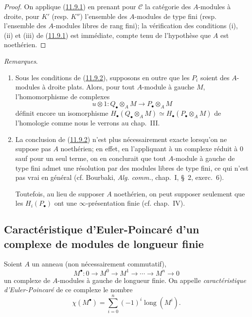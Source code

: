 \begin{proof}
On applique (\hyperref[0.11.9.1-fr]{11.9.1}) en prenant pour $\mathcal C$ la
catégorie des $A$-modules à droite, pour $K'$ (resp. $K''$) l'ensemble des
$A$-modules de type fini (resp. l'ensemble des $A$-modules libres de rang
fini); la vérification des conditions (i), (ii) et (iii) de
(\hyperref[0.11.9.1-fr]{11.9.1}) est immédiate, compte tenu de l'hypothèse
que $A$ est noethérien.
\end{proof}

\begin{env}[11.9.3]
\label{0.11.9.3-fr}
\emph{Remarques}.
\begin{enumerate}
\item[{\rm(i)}] Sous les conditions de
(\hyperref[0.11.9.2-fr]{11.9.2}), supposons en outre que les $P_i$ soient des
$A$-modules à droite plats. Alors, pour tout $A$-module à gauche $M$,
l'homomorphisme de complexes
\[
u\otimes 1:Q_\bullet\otimes_A M\longrightarrow P_\bullet\otimes_A M
\]
définit encore un isomorphisme
$H_\bullet(Q_\bullet\otimes_A M)\simeq
H_\bullet(P_\bullet\otimes_A M)$ de l'homologie comme nous le verrons au
chap.~III.
\item[{\rm(ii)}] La conclusion de (\hyperref[0.11.9.2-fr]{11.9.2}) n'est
plus nécessairement exacte lorsqu'on ne suppose pas $A$ noethérien; en
effet, en l'appliquant à un complexe réduit à $0$ sauf pour un seul terme, on
en conclurait que tout $A$-module à gauche de type fini admet une résolution
par des modules libres de type fini, ce qui n'est pas vrai en général
(cf. Bourbaki, \emph{Alg. comm.}, chap.~I, \S~2, exerc.~6).

Toutefois, au lieu de supposer $A$ noethérien, on peut supposer seulement que
les $H_i(P_\bullet)$ ont une $\infty$-présentation finie (cf. chap.~IV).
\end{enumerate}
\end{env}

\subsection{Caractéristique d'Euler-Poincaré d'un complexe de modules de
longueur finie}
\label{subsection:0.11.10-fr}

\begin{env}[11.10.1]
\label{0.11.10.1-fr}
Soient $A$ un anneau (non nécessairement commutatif),
\[
\label{0.11.10.1.1-fr}
\tag{11.10.1.1}
M^\bullet:0\longrightarrow M^0\longrightarrow M^1
\longrightarrow\cdots\longrightarrow M^n\longrightarrow0
\]
un complexe de $A$-modules à gauche de longueur finie. On appelle
\emph{caractéristique d'Euler-Poincaré} de ce complexe le nombre
\[
\label{0.11.10.1.2-fr}
\tag{11.10.1.2}
\chi(M^\bullet)=\sum_{i=0}^{n}(-1)^i\operatorname{long}(M^i).
\]
\end{env}

